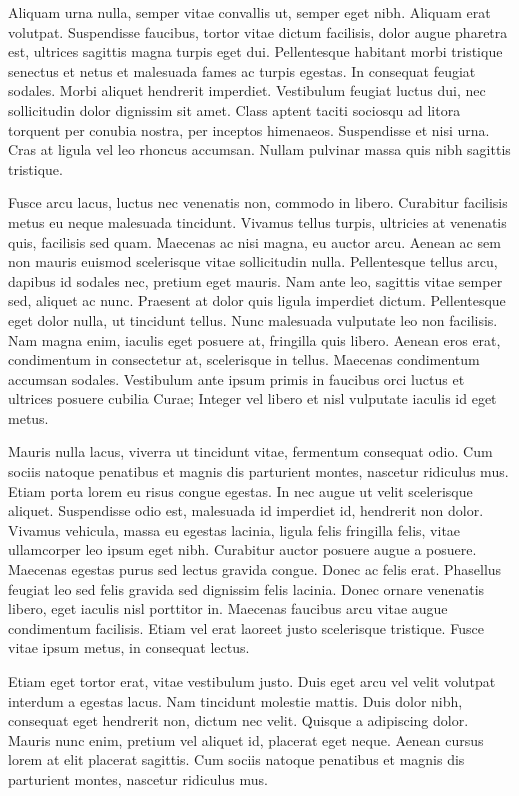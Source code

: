 \documentclass[a4paper]{article}
\begin{document}
Aliquam urna nulla, semper vitae convallis ut, semper eget nibh. Aliquam erat volutpat. Suspendisse faucibus, tortor vitae dictum facilisis, dolor augue pharetra est, ultrices sagittis magna turpis eget dui. Pellentesque habitant morbi tristique senectus et netus et malesuada fames ac turpis egestas. In consequat feugiat sodales. Morbi aliquet hendrerit imperdiet. Vestibulum feugiat luctus dui, nec sollicitudin dolor dignissim sit amet. Class aptent taciti sociosqu ad litora torquent per conubia nostra, per inceptos himenaeos. Suspendisse et nisi urna. Cras at ligula vel leo rhoncus accumsan. Nullam pulvinar massa quis nibh sagittis tristique.

Fusce arcu lacus, luctus nec venenatis non, commodo in libero. Curabitur facilisis metus eu neque malesuada tincidunt. Vivamus tellus turpis, ultricies at venenatis quis, facilisis sed quam. Maecenas ac nisi magna, eu auctor arcu. Aenean ac sem non mauris euismod scelerisque vitae sollicitudin nulla. Pellentesque tellus arcu, dapibus id sodales nec, pretium eget mauris. Nam ante leo, sagittis vitae semper sed, aliquet ac nunc. Praesent at dolor quis ligula imperdiet dictum. Pellentesque eget dolor nulla, ut tincidunt tellus. Nunc malesuada vulputate leo non facilisis. Nam magna enim, iaculis eget posuere at, fringilla quis libero. Aenean eros erat, condimentum in consectetur at, scelerisque in tellus. Maecenas condimentum accumsan sodales. Vestibulum ante ipsum primis in faucibus orci luctus et ultrices posuere cubilia Curae; Integer vel libero et nisl vulputate iaculis id eget metus.

Mauris nulla lacus, viverra ut tincidunt vitae, fermentum consequat odio. Cum sociis natoque penatibus et magnis dis parturient montes, nascetur ridiculus mus. Etiam porta lorem eu risus congue egestas. In nec augue ut velit scelerisque aliquet. Suspendisse odio est, malesuada id imperdiet id, hendrerit non dolor. Vivamus vehicula, massa eu egestas lacinia, ligula felis fringilla felis, vitae ullamcorper leo ipsum eget nibh. Curabitur auctor posuere augue a posuere. Maecenas egestas purus sed lectus gravida congue. Donec ac felis erat. Phasellus feugiat leo sed felis gravida sed dignissim felis lacinia. Donec ornare venenatis libero, eget iaculis nisl porttitor in. Maecenas faucibus arcu vitae augue condimentum facilisis. Etiam vel erat laoreet justo scelerisque tristique. Fusce vitae ipsum metus, in consequat lectus.

Etiam eget tortor erat, vitae vestibulum justo. Duis eget arcu vel velit volutpat interdum a egestas lacus. Nam tincidunt molestie mattis. Duis dolor nibh, consequat eget hendrerit non, dictum nec velit. Quisque a adipiscing dolor. Mauris nunc enim, pretium vel aliquet id, placerat eget neque. Aenean cursus lorem at elit placerat sagittis. Cum sociis natoque penatibus et magnis dis parturient montes, nascetur ridiculus mus.
\end{document}
